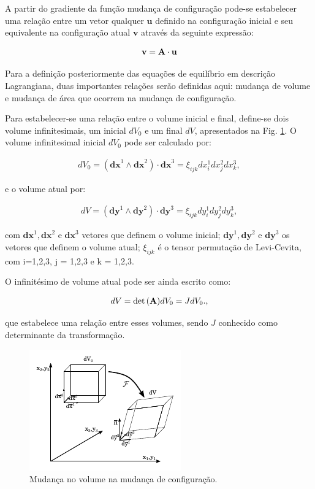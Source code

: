 \documentclass[tese_patricia]{subfiles}
\begin{document}
A partir do gradiente da função mudança de configuração pode-se estabelecer uma relação entre um vetor qualquer $\mathbf{u}$ definido na configuração inicial e seu equivalente na configuração atual $\mathbf{v}$ através da seguinte expressão:

\begin{align}
\mathbf{v} = \mathbf{A} \cdot \mathbf{u} \label{eq:RelVet}
\end{align}

Para a definição posteriormente das equações de equilíbrio em descrição Lagrangiana, duas importantes relações serão definidas aqui: mudança de volume e mudança de área que ocorrem na mudança de configuração.

Para estabelecer-se uma relação entre o volume inicial e final, define-se dois volume infinitesimais, um inicial $dV_{0}$ e um final $dV$, apresentados na Fig.  \ref{fig:DefVol}. O volume infinitesimal inicial $dV_{0}$ pode ser calculado por:

\begin{align}
dV_{0} = (\mathbf{dx}^{1} \wedge \mathbf{dx}^{2}) \cdot \mathbf{dx}^{3} =  \xi_{ijk}dx_{i}^{1} dx_{j}^{2} dx_{k}^{3},
\end{align}

\noindent e o volume atual por:

\begin{align}
dV = (\mathbf{dy}^{1} \wedge \mathbf{dy}^{2}) \cdot \mathbf{dy}^{3} = \xi_{ijk}dy_{i}^{1} dy_{j}^{2} dy_{k}^{3}, \label{eq:volatual}
\end{align}

\noindent com $\mathbf{dx}^1,\mathbf{dx}^2$ e $\mathbf{dx}^3$ vetores que definem o volume inicial; $\mathbf{dy}^1,\mathbf{dy}^2$ e $\mathbf{dy}^3$ os vetores que definem o volume atual; $\xi_{ijk}$ é o tensor permutação de Levi-Cevita, com i=1,2,3, j = 1,2,3 e k = 1,2,3.

O infinitésimo de volume atual pode ser ainda escrito como:

\begin{align}
dV = \det{\left(\mathbf{A}\right)} dV_{0} = JdV_{0}. \label {eq:relVol},
\end{align}

\noindent que estabelece uma relação entre esses volumes, sendo $J$ conhecido como determinante da transformação.

\begin{figure}[htb!]
	\centering
	\includegraphics[scale=2.0]{Imagens/Cap4/DefVol.pdf}	
	\caption{Mudança no volume na mudança de configuração.}
	\label{fig:DefVol}
\end{figure}
\end{document}
